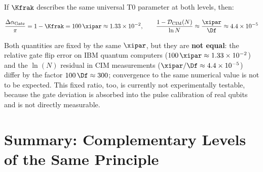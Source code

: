 If $\Kfrak$ describes the same universal T0 parameter at both levels, then:

\begin{equation}
    \frac{\Delta\alpha_{\text{Gate}}}{\pi} = 1 - \Kfrak = 100\,\xipar \approx 1.33 \times 10^{-2},
    \qquad
    \frac{1 - \mathcal{D}_{\text{CIM}}(N)}{\ln N} \approx \frac{\xipar}{\Df} \approx 4.4 \times 10^{-5}
    \label{eq:universal_kfrak}
\end{equation}

Both quantities are fixed by the same $\xipar$, but they are \textbf{not equal}: the relative
gate flip error on IBM quantum computers ($100\,\xipar \approx 1.33 \times 10^{-2}$) and the
$\ln(N)$ residual in CIM measurements ($\xipar/\Df \approx 4.4 \times 10^{-5}$) differ by the
factor $100\,\Df \approx 300$; convergence to the same numerical value is not to be expected.
This fixed ratio, too, is currently not experimentally testable, because the gate deviation is absorbed into the pulse calibration of real qubits and is not directly measurable.

\clearpage

\section{Summary: Complementary Levels of the Same Principle}
\label{sec:summary}

\begin{table}[h]
    \centering
    \caption{Full synthesis: both documents as complementary T0 levels}
    \label{tab:synthesis}
\end{table}

